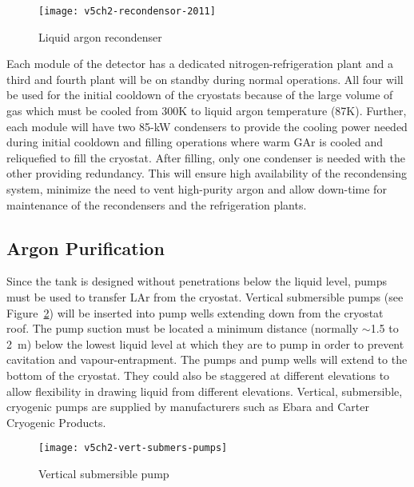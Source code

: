 \begin{figure}[htbp]
\centering
\texttt{[image: v5ch2-recondensor-2011]}
\caption{Liquid argon recondenser}
\label{fig:v5ch2-recondenser-sept-2011}
\end{figure}

Each module of the detector has a dedicated nitrogen-refrigeration plant 
 and a third and fourth plant will be on standby during normal operations. All four will be used
for the initial cooldown of the cryostats
because of the large volume of gas which must be cooled from 300K to liquid
argon temperature (87K). Further, each module will
have two 85-kW condensers to provide the
cooling power needed during initial cooldown and filling operations where warm GAr
is cooled and reliquefied to fill the cryostat.
After filling, only one condenser is needed with the
other providing redundancy.
This will ensure high availability of the recondensing system, minimize the need to vent high-purity argon and allow down-time for maintenance of
the recondensers and the refrigeration plants. 

\subsection{Argon Purification}
\label{subsec:argon-pur}
Since the tank is designed without penetrations below the liquid level, pumps must be used to transfer LAr from the cryostat.  Vertical submersible 
pumps (see Figure~\ref{fig:vert-submers-pumps}) will be inserted into pump wells extending down from the cryostat roof.  The pump suction 
must be located a minimum distance (normally $\sim$1.5 to 2~m) below 
the lowest liquid level at which they are to pump in order to prevent cavitation and vapour-entrapment. 
The pumps and pump wells will extend to the bottom of the cryostat.  They 
could also be staggered at different elevations to allow flexibility in drawing liquid from different 
elevations. Vertical, submersible, cryogenic pumps are supplied by manufacturers such as Ebara and 
Carter Cryogenic Products.


\begin{figure}[htbp]
\centering
\texttt{[image: v5ch2-vert-submers-pumps]}
\caption{Vertical submersible pump }
\label{fig:vert-submers-pumps}
\end{figure}

